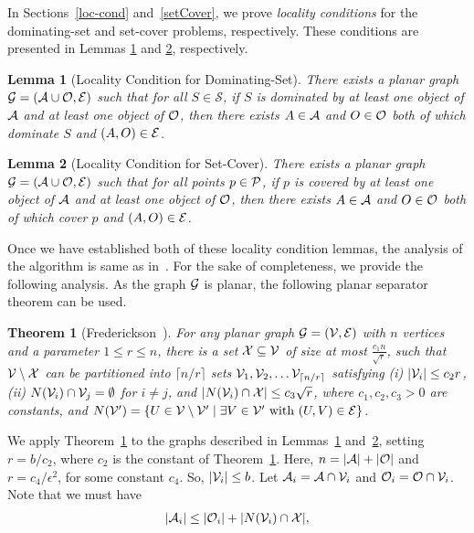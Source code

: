 \documentclass[a4paper,11pt]{article}
\newtheorem{theorem}{Theorem}
\newtheorem{lemma}{Lemma}
\begin{document}
In Sections~\ref{loc-cond} and~\ref{setCover}, we prove \emph{locality conditions} for the dominating-set and set-cover problems, respectively. These conditions are presented in Lemmas \ref{lem_loc_dom} and \ref{lem_loc_cov}, respectively.

\begin{lemma}[Locality Condition for Dominating-Set]\label{lem_loc_dom}
 There exists a planar graph $ {\cal G}=({\cal A}\cup {\cal O}, {\cal E})$ 
such that for all 
$S\in \mathscr{S}$, if $S$ is dominated by at least one object of $\cal A$ and at least one object of $\cal O$, then there exists $A\in {\cal A}$ and $O\in {\cal O}$ both of which dominate $S$ and $(A,O)\in {\cal E}$.
\end{lemma}

\begin{lemma}[Locality Condition for Set-Cover]
\label{lem_loc_cov}
 There exists a planar graph $ {\cal G}=({\cal A}\cup {\cal O}, {\cal E})$ 
such that for all points
$p\in {\cal P}$, if $p$ is covered by at least one object  of $\cal A$ and at least one object of $\cal O$, then there exists $A\in {\cal A}$ and $O\in {\cal O}$ both of which cover $p$ and $(A,O)\in {\cal E}$.  
\end{lemma}

Once we have established both of these
locality condition lemmas, the analysis of the 
algorithm is same 
as in~\cite{MustafaR10}. 
For the sake of completeness, we provide the following analysis.
As  the graph ${\cal G}$ is planar, the following planar separator theorem can 
be used.

\begin{theorem}[Frederickson~\cite{Frederickson87}]\label{THseparator}
 For any planar graph ${\cal G}=({\cal V},{\cal E})$  {with} $n$ vertices  {and a parameter $1\leq r 
\leq n$},  there is 
a set ${\cal X}\subseteq 
{\cal V}$ of size at most $\frac{c_1n}{\sqrt{r}}$, such that  ${\cal V}\setminus 
{\cal X}$ can be 
partitioned into  {$\lceil n/r \rceil$ sets ${\cal V}_1,{\cal V}_2,\ldots {\cal V}_{\lceil n/r \rceil}$} 
satisfying (i) 
$|{\cal V}_i|\leq c_2r$, (ii) $N({\cal V}_i)\cap {\cal V}_j=\emptyset$ for 
$i\neq j$, and 
$|N({\cal V}_i)\cap {\cal X}|\leq c_3\sqrt{r}$, where $c_1,c_2,c_3>0$ are 
constants, and $N({\cal V}')=\{U\in {\cal V}\setminus {\cal V}'\mid \exists V\in 
{\cal V}' \text{ with } (U,V)\in 
{\cal E}  \}$.  
\end{theorem}

We apply Theorem~\ref{THseparator} to the graphs described in Lemmas~\ref{lem_loc_dom} and~\ref{lem_loc_cov}, setting $r = b/c_2$, where $c_2$ is the constant of Theorem~\ref{THseparator}.   Here,  $n = |{\cal A}| + |{\cal O}|$ and $r = c_4/\epsilon^2$, for some constant $c_4$. So, $|{\cal 
V}_i| \leq 
b$.
Let ${\cal A}_i={\cal A}\cap {\cal V}_i$ and ${\cal O}_i={\cal O}\cap 
{\cal 
V}_i$.  Note that we must have 
\begin{align}\label{eq0}
|{\cal A}_i|\leq |{\cal O}_i|+|N({\cal V}_i)\cap {\cal X}|,
\end{align}
\end{document}
